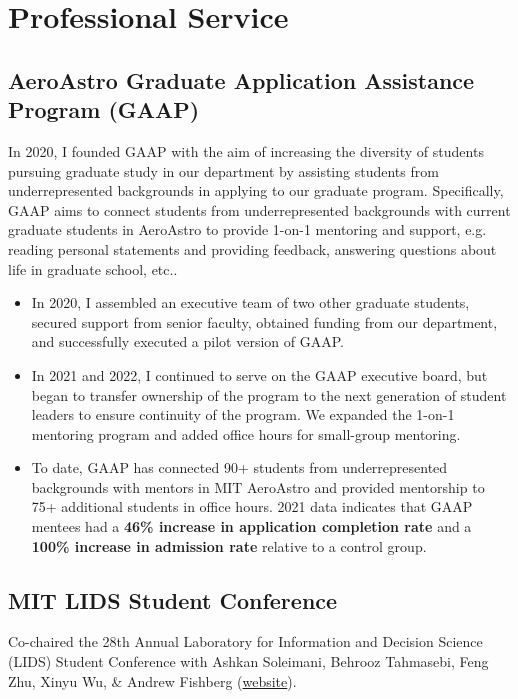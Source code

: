 \documentclass{cv_style}
\begin{document}
\section{Professional Service}

\subsection{AeroAstro Graduate Application Assistance Program (GAAP)}
In 2020, I founded GAAP with the aim of increasing the diversity of students pursuing graduate study in our department by assisting students from underrepresented backgrounds in applying to our graduate program. Specifically, GAAP aims to connect students from underrepresented backgrounds with current graduate students in AeroAstro to provide 1-on-1 mentoring and support, e.g. reading personal statements and providing feedback, answering questions about life in graduate school, etc..
\begin{itemize}
    \item In 2020, I assembled an executive team of two other graduate students, secured support from senior faculty, obtained funding from our department, and successfully executed a pilot version of GAAP.
    \item In 2021 and 2022, I continued to serve on the GAAP executive board, but began to transfer ownership of the program to the next generation of student leaders to ensure continuity of the program. We expanded the 1-on-1 mentoring program and added office hours for small-group mentoring.
    \item To date, GAAP has connected 90+ students from underrepresented backgrounds with mentors in MIT AeroAstro and provided mentorship to 75+ additional students in office hours. 2021 data indicates that GAAP mentees had a \textbf{46\% increase in application completion rate} and a \textbf{100\% increase in admission rate} relative to a control group.
\end{itemize}

\subsection{MIT LIDS Student Conference}
\begin{trivlist}
    \item Co-chaired the 28th Annual Laboratory for Information and Decision Science (LIDS) Student Conference with Ashkan Soleimani, Behrooz Tahmasebi, Feng Zhu, Xinyu Wu, \& Andrew Fishberg (\href{https://lidsconf.mit.edu}{website}).
\end{trivlist}
\end{document}
